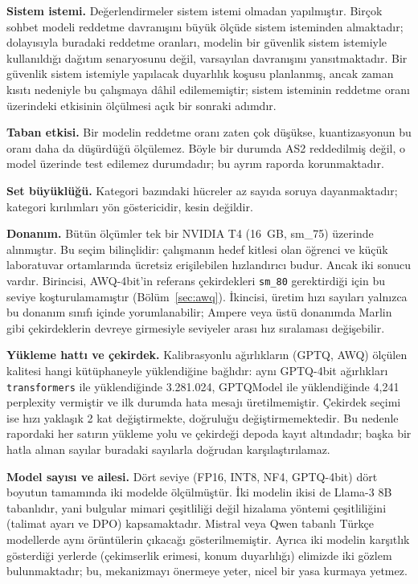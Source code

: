 \documentclass[conference]{IEEEtran}
\begin{document}
\textbf{Sistem istemi.} Değerlendirmeler sistem istemi olmadan yapılmıştır.
Birçok sohbet modeli reddetme davranışını büyük ölçüde sistem isteminden
almaktadır; dolayısıyla buradaki reddetme oranları, modelin bir güvenlik
sistem istemiyle kullanıldığı dağıtım senaryosunu değil, varsayılan davranışını
yansıtmaktadır. Bir güvenlik sistem istemiyle yapılacak duyarlılık koşusu
planlanmış, ancak zaman kısıtı nedeniyle bu çalışmaya dâhil edilememiştir;
sistem isteminin reddetme oranı üzerindeki etkisinin ölçülmesi açık bir
sonraki adımdır.

\textbf{Taban etkisi.} Bir modelin reddetme oranı zaten çok düşükse,
kuantizasyonun bu oranı daha da düşürdüğü ölçülemez. Böyle bir durumda AS2
reddedilmiş değil, o model üzerinde test edilemez durumdadır; bu ayrım raporda
korunmaktadır.

\textbf{Set büyüklüğü.} Kategori bazındaki hücreler az sayıda soruya
dayanmaktadır; kategori kırılımları yön göstericidir, kesin değildir.

\textbf{Donanım.} Bütün ölçümler tek bir NVIDIA T4 (16~GB, sm\_75)
üzerinde alınmıştır. Bu seçim bilinçlidir: çalışmanın hedef kitlesi olan
öğrenci ve küçük laboratuvar ortamlarında ücretsiz erişilebilen hızlandırıcı
budur. Ancak iki sonucu vardır. Birincisi, AWQ-4bit'in referans çekirdekleri
\texttt{sm\_80} gerektirdiği için bu seviye koşturulamamıştır
(Bölüm~\ref{sec:awq}). İkincisi, üretim hızı sayıları yalnızca bu donanım
sınıfı içinde yorumlanabilir; Ampere veya üstü donanımda Marlin gibi
çekirdeklerin devreye girmesiyle seviyeler arası hız sıralaması değişebilir.

\textbf{Yükleme hattı ve çekirdek.} Kalibrasyonlu ağırlıkların (GPTQ, AWQ)
ölçülen kalitesi hangi kütüphaneyle yüklendiğine bağlıdır: aynı GPTQ-4bit
ağırlıkları \texttt{transformers} ile yüklendiğinde 3.281.024, GPTQModel ile
yüklendiğinde 4,241 perplexity vermiştir ve ilk durumda hata mesajı
üretilmemiştir. Çekirdek seçimi ise hızı yaklaşık 2 kat değiştirmekte,
doğruluğu değiştirmemektedir. Bu nedenle rapordaki her satırın yükleme yolu ve
çekirdeği depoda kayıt altındadır; başka bir hatla alınan sayılar buradaki
sayılarla doğrudan karşılaştırılamaz.

\textbf{Model sayısı ve ailesi.} Dört seviye (FP16, INT8, NF4, GPTQ-4bit)
dört boyutun tamamında iki modelde ölçülmüştür. İki modelin ikisi de Llama-3 8B tabanlıdır,
yani bulgular mimari çeşitliliği değil hizalama yöntemi çeşitliliğini
(talimat ayarı ve DPO) kapsamaktadır. Mistral veya Qwen tabanlı Türkçe
modellerde aynı örüntülerin çıkacağı gösterilmemiştir. Ayrıca iki modelin
karşıtlık gösterdiği yerlerde (çekimserlik erimesi, konum duyarlılığı)
elimizde iki gözlem bulunmaktadır; bu, mekanizmayı önermeye yeter, nicel bir
yasa kurmaya yetmez.
\end{document}
